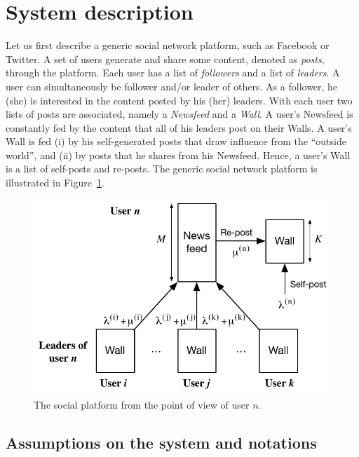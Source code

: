 \documentclass[10pt, conference, letterpaper]{IEEEtran}
\begin{document}
\section{System description}
\label{systemd}


Let us first describe a generic social network platform, such as Facebook or Twitter. A set of users generate and share some content, denoted as \textit{posts}, through the platform. Each user has a list of \textit{followers} and a list of \textit{leaders}. A user can simultaneously be follower and/or leader of others. As a follower, he (she) is interested in the content posted by his (her) leaders. With each user two lists of posts are associated, namely a \textit{Newsfeed} and a \textit{Wall}.
A user's Newsfeed is constantly fed by the content that all of his leaders post on their Walls. A user's Wall is fed (i) by his self-generated posts that draw influence from the ``outside world'', and (ii) by posts that he shares from his Newsfeed. Hence, a user's Wall is a list of self-posts and re-posts. The generic social network platform is illustrated in Figure~\ref{system}.

\begin{figure}[h!]
\centering
\includegraphics[width=0.8\linewidth]{System.pdf}
\caption{The social platform from the point of view of user $n$.\label{system}}
\end{figure} 


\subsection{Assumptions on the system and notations}
\end{document}
